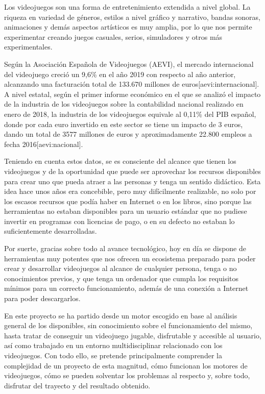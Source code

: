 Los videojuegos son una forma de entretenimiento extendida a nivel global. La riqueza en variedad de géneros, estilos a nivel gráfico y narrativo, bandas sonoras, animaciones y demás aspectos artísticos es muy amplia, por lo que nos permite experimentar creando juegos casuales, serios, simuladores y otros más experimentales.

Según la Asociación Española de Videojuegos (AEVI), el mercado internacional del videojuego creció un 9,6\% en el año 2019 con respecto al año anterior, alcanzando una facturación total de 133.670 millones de euros[aevi:internacional]. A nivel estatal, según el primer informe económico en el que se analizó el impacto de la industria de los videojuegos sobre la contabilidad nacional realizado en enero de 2018, la industria de los videojuegos equivale al 0,11\% del PIB español, donde por cada euro invertido en este sector se tiene un impacto de 3 euros, dando un total de 3577 millones de euros y aproximadamente 22.800 empleos a fecha 2016[aevi:nacional]. 

Teniendo en cuenta estos datos, se es consciente del alcance que tienen los videojuegos y de la oportunidad que puede ser aprovechar los recursos disponibles para crear uno que pueda atraer a las personas y tenga un sentido didáctico. Esta idea hace unos años era concebible, pero muy difícilmente realizable, no solo por los escasos recursos que podía haber en Internet o en los libros, sino porque las herramientas no estaban disponibles para un usuario estándar que no pudiese invertir en programas con licencias de pago, o en su defecto no estaban lo suficientemente desarrolladas.

Por suerte, gracias sobre todo al avance tecnológico, hoy en día se dispone de herramientas muy potentes que nos ofrecen un ecosistema preparado para poder crear y desarrollar videojuegos al alcance de cualquier persona, tenga o no conocimientos previos, y que tenga un ordenador que cumpla los requisitos mínimos para un correcto funcionamiento, además de una conexión a Internet para poder descargarlos.

En este proyecto se ha partido desde un motor escogido en base al análisis general de los disponibles, sin conocimiento sobre el funcionamiento del mismo, hasta tratar de conseguir un videojuego jugable, disfrutable y accesible al usuario, así como trabajado en un entorno multidisciplinar relacionado con los videojuegos. Con todo ello, se pretende principalmente comprender la complejidad de un proyecto de esta magnitud, cómo funcionan los motores de videojuegos, cómo se pueden solventar los problemas al respecto y, sobre todo, disfrutar del trayecto y del resultado obtenido.

